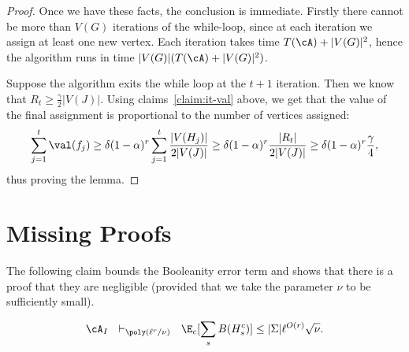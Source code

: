 \begin{proof}
Once we have these facts, the conclusion is immediate. Firstly there cannot be more than $V(G)$ iterations of the while-loop, since at each iteration we assign at least one new vertex. Each iteration takes time $T(\cA) + |V(G)|^2$, hence the algorithm runs in time $|V(G)|(T(\cA) + |V(G)|^2)$. 

Suppose the algorithm exits the while loop at the $t+1$ iteration. Then we know that $R_{t} \geq \frac{\gamma}{2}|V(J)|$.
Using claims~\ref{claim:it-val} above, we get that the value of the final assignment is proportional to the number of vertices assigned: 
\[\sum_{j=1}^t\val(f_j) \geq \delta(1 - \alpha)^r \sum_{j=1}^t \frac{|V(H_j)|}{2|V(J)|} \geq \delta(1 - \alpha)^r\frac{|R_t|}{2|V(J)|} \geq \delta(1 - \alpha)^r\frac{\gamma}{4},\]
thus proving the lemma.
\end{proof}
\section{Missing Proofs}\label{sec:missing_pfs}

The following claim bounds the Booleanity error term 
and shows that there is a \sos proof that they are
negligible (provided that we take the parameter $\nu$ 
to be sufficiently small).
\begin{claim}\label{claim:bool}
\[\cA_I ~~ \vdash_{\poly(\ell^r/\nu)} ~~ \E_{c}[\sum_s B(H^c_s)] \leq |\Sigma|\ell^{O(r)}\sqrt{\nu}.\]
\end{claim}


